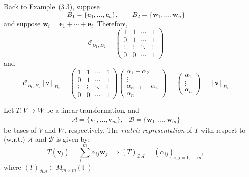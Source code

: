 \begin{example}
Back to Example~(3.3), suppose
\[
B_1=\{\bm e_1,\dots,\bm e_n\},
\qquad
B_2=\{\bm w_1,\dots,\bm w_n\}
\]
and suppose $\bm w_i=\bm e_1+\cdots+\bm e_i$. Therefore,
\[
\mathcal{C}_{B_1,B_2}=\begin{pmatrix}
1&1&\cdots&1\\
0&1&\cdots&1\\
\vdots&\vdots&\ddots&\vdots\\
0&0&\cdots&1
\end{pmatrix}
\]
and
\[
\mathcal{C}_{B_1,B_2}[\bm v]_{B_2}
=
\begin{pmatrix}
1&1&\cdots&1\\
0&1&\cdots&1\\
\vdots&\vdots&\ddots&\vdots\\
0&0&\cdots&1
\end{pmatrix}
\begin{pmatrix}
\alpha_1-\alpha_2\\\vdots\\\alpha_{n-1}-\alpha_n\\\alpha_n
\end{pmatrix}=\begin{pmatrix}
\alpha_1\\\vdots\\\alpha_n
\end{pmatrix}=[\bm v]_{B_2}
\]
\end{example}

\begin{definition}
Let $T:V\to W$ be a linear transformation, and 
\[
\begin{array}{ll}
\mathcal{A}=\{\bm v_1,\dots,\bm v_m\},
&
\mathcal{B}=\{\bm w_1,\dots,\bm w_m\}
\end{array}
\]
be bases of $V$ and $W$, respectively. 
The \emph{matrix representation} of $T$ with respect to (w.r.t.) $\mathcal{A}$ and $\mathcal{B}$ is given by:
\[
T(\bm v_j)=\sum_{i=1}^m\alpha_{ij}\bm w_j
\implies
(T)_{\mathcal{B}\mathcal{A}}
=
(\alpha_{ij})_{i,j=1,\dots,m},
\]
where $(T)_{\mathcal{B}\mathcal{A}}\in M_{m\times m}(\mathbb{F})$.
\end{definition}











